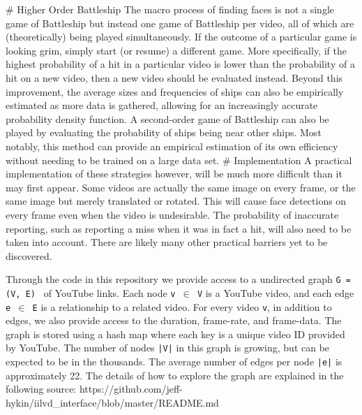 \documentclass{article}
\def\code#1{\texttt{#1}}
\def\member{$\in$ }
\newcommand{\br}{ \hfill \break}
\begin{document}
\begin{adjustwidth}{2.5em}{0pt}
\br
\# Higher Order Battleship\br
\br
The macro process of finding faces is not a single game of Battleship but instead one game of Battleship per video, all of which are (theoretically) being played simultaneously. If the outcome of a particular game is looking grim, simply start (or resume) a different game. More specifically, if the highest probability of a hit in a particular video is lower than the probability of a hit on a new video, then a new video should be evaluated instead. Beyond this improvement, the average sizes and frequencies of ships can also be empirically estimated as more data is gathered, allowing for an increasingly accurate probability density function. A second-order game of Battleship can also be played by evaluating the probability of ships being near other ships. Most notably, this method can provide an empirical estimation of its own efficiency without needing to be trained on a large data set.\br
\br
\# Implementation\br
\br
A practical implementation of these strategies however, will be much more difficult than it may first appear. Some videos are actually the same image on every frame, or the same image but merely translated or rotated. This will cause face detections on every frame even when the video is undesirable. The probability of inaccurate reporting, such as reporting a miss when it was in fact a hit, will also need to be taken into account. There are likely many other practical barriers yet to be discovered.

\end{adjustwidth} \br


%
%
%
\date{June 18 2020} \br \begin{adjustwidth}{2.5em}{0pt}

Through the code in this repository we provide access to a undirected graph \code{G = (V, E) }  of YouTube links. Each node \code{v \member V} is a YouTube video, and each edge \code{e \member  E} is a relationship to a related video. For every video \code{v}, in addition to edges, we also provide access to the duration, frame-rate, and frame-data. The graph is stored using a hash map where each key is a unique video ID provided by YouTube. The number of nodes \code{|V|} in this graph is growing, but can be expected to be in the thousands. The average number of edges per node \code{|e|} is approximately 22. The details of how to explore the graph are explained in the following source: \br
https://github.com/jeff-hykin/iilvd\_interface/blob/master/README.md

\end{adjustwidth} \br
\end{document}
